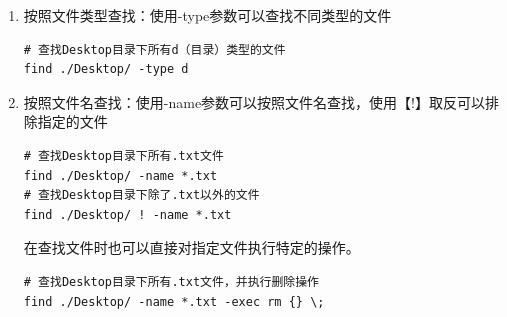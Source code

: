 \documentclass[12pt, openany, oneside]{book}
\begin{document}
\begin{enumerate}
	\item 按照文件类型查找：使用-type参数可以查找不同类型的文件
	      \vspace{-0.5cm}
	      \begin{lstlisting}
# 查找Desktop目录下所有d（目录）类型的文件
find ./Desktop/ -type d
\end{lstlisting}

	      \begin{table}[H]
		      \centering
		      \caption{文件类型}
	      \end{table}

	\item 按照文件名查找：使用-name参数可以按照文件名查找，使用【!】取反可以排除指定的文件
	      \vspace{-0.5cm}
	      \begin{lstlisting}
# 查找Desktop目录下所有.txt文件
find ./Desktop/ -name *.txt
# 查找Desktop目录下除了.txt以外的文件
find ./Desktop/ ! -name *.txt
            \end{lstlisting}

	      在查找文件时也可以直接对指定文件执行特定的操作。
	      \vspace{-0.5cm}
	      \begin{lstlisting}
# 查找Desktop目录下所有.txt文件，并执行删除操作
find ./Desktop/ -name *.txt -exec rm {} \;
            \end{lstlisting}
\end{enumerate}
\end{document}

